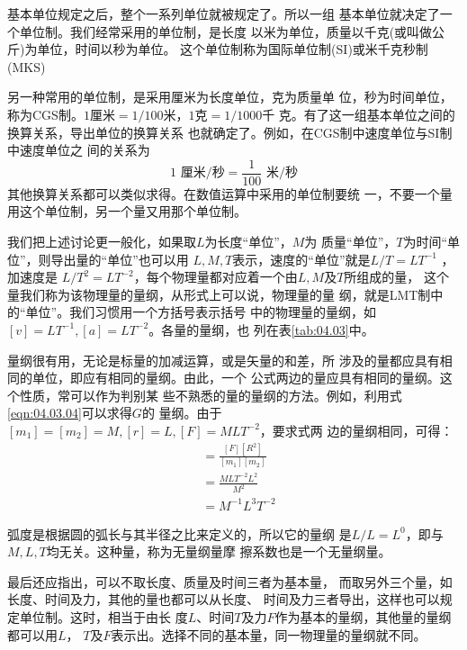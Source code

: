 基本单位规定之后，整个一系列单位就被规定了。所以一组
基本单位就决定了一个单位制。我们经常采用的单位制，是长度
以米为单位，质量以千克(或叫做公斤)为单位，时间以秒为单位。
这个单位制称为国际单位制(SI)或米千克秒制(MKS)

另一种常用的单位制，是采用厘米为长度单位，克为质量单
位，秒为时间单位，称为CGS制。$ 1 $厘米$ =1/100 $米，$ 1 $克$ =1/1000 $千
克。有了这一组基本单位之间的换算关系，导出单位的换算关系
也就确定了。例如，在CGS制中速度单位与SI制中速度单位之
间的关系为
\begin{equation*}
  1 \text{ 厘米/秒} = \frac { 1 } { 1 0 0 } \text{ 米/秒}
\end{equation*}
其他换算关系都可以类似求得。在数值运算中采用的单位制要统
\clearpage\noindent
一，不要一个量用这个单位制，另一个量又用那个单位制。

我们把上述讨论更一般化，如果取$ L $为长度“单位”，$ M $为
质量“单位”，$ T $为时间“单位”，则导出量的“单位”也可以用
$ L , M , T $表示，速度的“单位”就是$ L / T = L T ^ { - 1 } $ ，加速度是
$ L / T ^ { 2 } = L T ^ { - 2 } $，每个物理量都对应着一个由$ L , M $及$ T $所组成的量，
这个量我们称为该物理量的量纲，从形式上可以说，物理量的量
纲，就是LMT制中的“单位”。我们习惯用一个方括号表示括号
中的物理量的量纲，如$ [ v ] = L T ^ { - 1 } , [ a ] = L T ^ { - 2 }$。各量的量纲，也
列在表\ref{tab:04.03}中。

量纲很有用，无论是标量的加减运算，或是矢量的和差，所
涉及的量都应具有相同的单位，即应有相同的量纲。由此，一个
公式两边的量应具有相同的量纲。这个性质，常可以作为判别某
些不熟悉的量的量纲的方法。例如，利用式\eqref{eqn:04.03.04}可以求得$ G $的
量纲。由于$ [ m _ { 1 } ] = [ m _ { 2 } ] = M , [ r ] = L , [ F ] = M L T ^ { - 2 } $，要求式两
边的量纲相同，可得：
\begin{align*}
  [ G ] & = \frac { [ F ] [ R ^ 2] } { [ m _ { 1 } ] [ m _ { 2 } ] } \\
        & = \frac { M L T ^ { - 2 } L ^ { 2 } } { M ^ { 2 } }        \\
        & = M ^ { - 1 } L ^ { 3 } T ^ { - 2 }
\end{align*}

弧度是根据圆的弧长与其半径之比来定义的，所以它的量纲
是$ L / L = L ^ { 0 } $，即与$ M , L , T $均无关。这种量，称为无量纲量摩
擦系数也是一个无量纲量。

最后还应指出，可以不取长度、质量及时间三者为基本量，
而取另外三个量，如长度、时间及力，其他的量也都可以从长度、
时间及力三者导出，这样也可以规定单位制。这时，相当于由长
度$ L $、时间$ T $及力$ F $作为基本的量纲，其他量的量纲都可以用$ L $，
$ T $及$ F $表示出。选择不同的基本量，同一物理量的量纲就不同。
